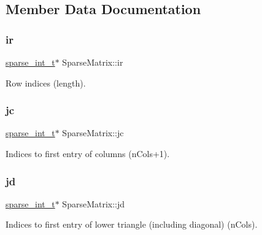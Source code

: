 \subsection{Member Data Documentation}
\mbox{\label{class_sparse_matrix_a31cffc07bca675d7feb34cac91cd378b}} 
\subsubsection{\texorpdfstring{ir}{ir}}
{\footnotesize\ttfamily \hyperlink{_types_8hpp_aa5432b00c9081e2d62d7f38c32e4ed80}{sparse\+\_\+int\+\_\+t}$\ast$ Sparse\+Matrix\+::ir\hspace{0.3cm}{\ttfamily [protected]}}

Row indices (length). \mbox{\label{class_sparse_matrix_af03f3af2ef00771022a26d5b86e40399}} 
\subsubsection{\texorpdfstring{jc}{jc}}
{\footnotesize\ttfamily \hyperlink{_types_8hpp_aa5432b00c9081e2d62d7f38c32e4ed80}{sparse\+\_\+int\+\_\+t}$\ast$ Sparse\+Matrix\+::jc\hspace{0.3cm}{\ttfamily [protected]}}

Indices to first entry of columns (n\+Cols+1). \mbox{\label{class_sparse_matrix_a25c7628d9d0944161c25566900b49631}} 
\subsubsection{\texorpdfstring{jd}{jd}}
{\footnotesize\ttfamily \hyperlink{_types_8hpp_aa5432b00c9081e2d62d7f38c32e4ed80}{sparse\+\_\+int\+\_\+t}$\ast$ Sparse\+Matrix\+::jd\hspace{0.3cm}{\ttfamily [protected]}}

Indices to first entry of lower triangle (including diagonal) (n\+Cols). \mbox{\label{class_sparse_matrix_a5cdff014cc202f3c6c906fa8b8a4317a}} 
